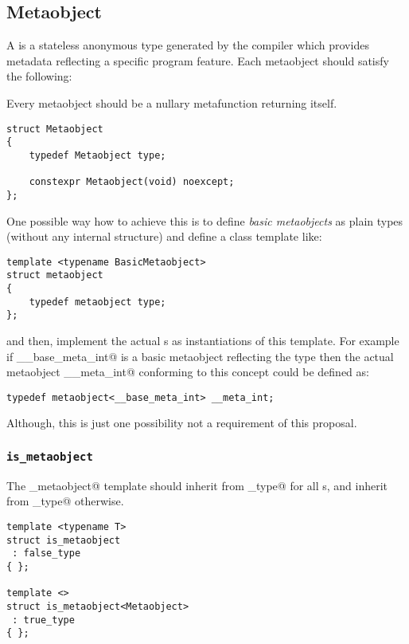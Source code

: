 \subsection{Metaobject}
\label{concept-Metaobject}

A  is a stateless anonymous type generated by the compiler which
provides metadata reflecting a specific program feature. Each metaobject
should satisfy the following:

Every metaobject should be a nullary metafunction returning itself.

\begin{verbatim}
struct Metaobject
{
	typedef Metaobject type;

	constexpr Metaobject(void) noexcept;
};
\end{verbatim}

One possible way how to achieve this is to define {\em basic metaobjects}
as plain types (without any internal structure) and define a class template like:

\begin{verbatim}
template <typename BasicMetaobject>
struct metaobject
{
	typedef metaobject type;
};
\end{verbatim}

and then, implement the actual s as instantiations of this template.
For example if \verb@__base_meta_int@ is a basic metaobject reflecting the \verb@int@
type then the actual metaobject \verb@__meta_int@ conforming to this concept could 
be defined as:

\begin{verbatim}
typedef metaobject<__base_meta_int> __meta_int;
\end{verbatim}

Although, this is just one possibility not a requirement of this proposal.

\subsubsection{\texttt{is\_metaobject}}

The \verb@is_metaobject@ template should inherit from \verb@true_type@ for all s,
and inherit from \verb@false_type@ otherwise.

\begin{verbatim}
template <typename T>
struct is_metaobject
 : false_type
{ };

template <>
struct is_metaobject<Metaobject>
 : true_type
{ };
\end{verbatim}

